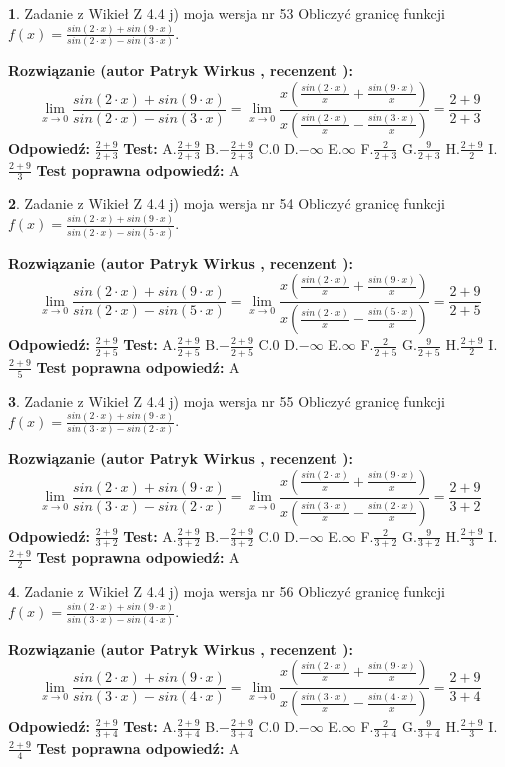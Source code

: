 \documentclass[12pt, a4paper]{article}
\theoremstyle{definition} %
\newtheorem{zad}{}
\newcommand{\zadStart}[1]{\begin{zad}#1\newline}
\newcommand{\zadStop}{\end{zad}}
\newcommand{\rozwStart}[2]{\noindent \textbf{Rozwiązanie (autor #1 , recenzent #2): }\newline}
\newcommand{\rozwStop}{\newline}
\newcommand{\odpStart}{\noindent \textbf{Odpowiedź:}\newline}
\newcommand{\odpStop}{\newline}
\newcommand{\testStart}{\noindent \textbf{Test:}\newline}
\newcommand{\testStop}{\newline}
\newcommand{\kluczStart}{\noindent \textbf{Test poprawna odpowiedź:}\newline}
\newcommand{\kluczStop}{\newline}
\begin{document}
\zadStart{Zadanie z Wikieł Z 4.4 j) moja wersja nr 53}
Obliczyć granicę funkcji $f(x)=\frac{sin(2\cdot x) +sin(9\cdot x)}{sin(2\cdot x) -sin(3\cdot x)}$.
\zadStop
\rozwStart{Patryk Wirkus}{}
$$\lim\limits_{x\to 0}\frac{sin(2\cdot x) +sin(9\cdot x)}{sin(2\cdot x) -sin(3\cdot x)}=\lim\limits_{x\to 0}\frac{x(\frac{sin(2\cdot x)}{x}+\frac{sin(9\cdot x)}{x})}{x(\frac{sin(2\cdot x)}{x}-\frac{sin(3\cdot x)}{x})}=\frac{2+9}{2+3}$$
\rozwStop
\odpStart
$\frac{2+9}{2+3}$
\odpStop
\testStart
A.$\frac{2+9}{2+3}$
B.$-\frac{2+9}{2+3}$
C.$0$
D.$-\infty$
E.$\infty$
F.$\frac{2}{2+3}$
G.$\frac{9}{2+3}$
H.$\frac{2+9}{2}$
I.$\frac{2+9}{3}$
\testStop
\kluczStart
A
\kluczStop



\zadStart{Zadanie z Wikieł Z 4.4 j) moja wersja nr 54}
Obliczyć granicę funkcji $f(x)=\frac{sin(2\cdot x) +sin(9\cdot x)}{sin(2\cdot x) -sin(5\cdot x)}$.
\zadStop
\rozwStart{Patryk Wirkus}{}
$$\lim\limits_{x\to 0}\frac{sin(2\cdot x) +sin(9\cdot x)}{sin(2\cdot x) -sin(5\cdot x)}=\lim\limits_{x\to 0}\frac{x(\frac{sin(2\cdot x)}{x}+\frac{sin(9\cdot x)}{x})}{x(\frac{sin(2\cdot x)}{x}-\frac{sin(5\cdot x)}{x})}=\frac{2+9}{2+5}$$
\rozwStop
\odpStart
$\frac{2+9}{2+5}$
\odpStop
\testStart
A.$\frac{2+9}{2+5}$
B.$-\frac{2+9}{2+5}$
C.$0$
D.$-\infty$
E.$\infty$
F.$\frac{2}{2+5}$
G.$\frac{9}{2+5}$
H.$\frac{2+9}{2}$
I.$\frac{2+9}{5}$
\testStop
\kluczStart
A
\kluczStop



\zadStart{Zadanie z Wikieł Z 4.4 j) moja wersja nr 55}
Obliczyć granicę funkcji $f(x)=\frac{sin(2\cdot x) +sin(9\cdot x)}{sin(3\cdot x) -sin(2\cdot x)}$.
\zadStop
\rozwStart{Patryk Wirkus}{}
$$\lim\limits_{x\to 0}\frac{sin(2\cdot x) +sin(9\cdot x)}{sin(3\cdot x) -sin(2\cdot x)}=\lim\limits_{x\to 0}\frac{x(\frac{sin(2\cdot x)}{x}+\frac{sin(9\cdot x)}{x})}{x(\frac{sin(3\cdot x)}{x}-\frac{sin(2\cdot x)}{x})}=\frac{2+9}{3+2}$$
\rozwStop
\odpStart
$\frac{2+9}{3+2}$
\odpStop
\testStart
A.$\frac{2+9}{3+2}$
B.$-\frac{2+9}{3+2}$
C.$0$
D.$-\infty$
E.$\infty$
F.$\frac{2}{3+2}$
G.$\frac{9}{3+2}$
H.$\frac{2+9}{3}$
I.$\frac{2+9}{2}$
\testStop
\kluczStart
A
\kluczStop



\zadStart{Zadanie z Wikieł Z 4.4 j) moja wersja nr 56}
Obliczyć granicę funkcji $f(x)=\frac{sin(2\cdot x) +sin(9\cdot x)}{sin(3\cdot x) -sin(4\cdot x)}$.
\zadStop
\rozwStart{Patryk Wirkus}{}
$$\lim\limits_{x\to 0}\frac{sin(2\cdot x) +sin(9\cdot x)}{sin(3\cdot x) -sin(4\cdot x)}=\lim\limits_{x\to 0}\frac{x(\frac{sin(2\cdot x)}{x}+\frac{sin(9\cdot x)}{x})}{x(\frac{sin(3\cdot x)}{x}-\frac{sin(4\cdot x)}{x})}=\frac{2+9}{3+4}$$
\rozwStop
\odpStart
$\frac{2+9}{3+4}$
\odpStop
\testStart
A.$\frac{2+9}{3+4}$
B.$-\frac{2+9}{3+4}$
C.$0$
D.$-\infty$
E.$\infty$
F.$\frac{2}{3+4}$
G.$\frac{9}{3+4}$
H.$\frac{2+9}{3}$
I.$\frac{2+9}{4}$
\testStop
\kluczStart
A
\kluczStop
\end{document}
